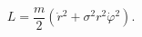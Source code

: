 \begin{equation}
L=\frac{m}{2}(\dot{r}{}^2+
\sigma^2 r^2\dot{\varphi}{}^2).
\label{lcone}
\end{equation}

